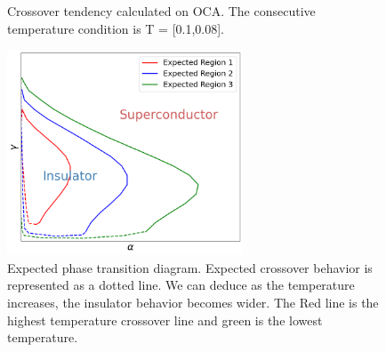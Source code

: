 \documentclass{article}[12pt]
\begin{document}
\begin{spacing}{1.5}
\begin{figure}[H]
  \caption{Crossover tendency calculated on OCA. The consecutive temperature condition is T = [0.1,0.08].}
\end{figure}
\begin{figure}[H]
  \centerline{\includegraphics[width=7cm]{TexFigure/Expecregi.png}}
  \caption{Expected phase transition diagram. Expected crossover behavior is represented as a dotted line. 
  We can deduce as the temperature increases, the insulator behavior becomes wider. 
  The Red line is the highest temperature crossover line and green is the lowest temperature.}
\end{figure}
\vfill


\pagebreak
\newpage


\end{spacing}
\end{document}
